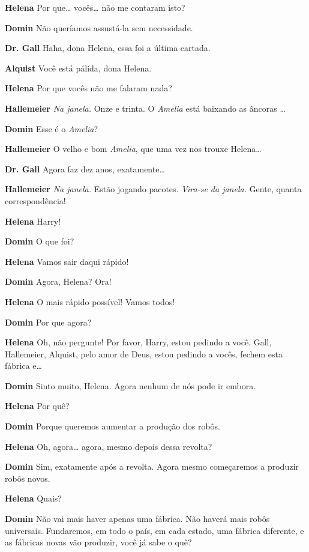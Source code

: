\textbf{Helena} Por que\ldots{} vocês\ldots{} não me contaram isto?

\textbf{Domin} Não queríamos assustá-la sem necessidade.

\textbf{Dr. Gall} Haha, dona Helena, essa foi a última cartada.

\textbf{Alquist} Você está pálida, dona Helena.

\textbf{Helena} Por que vocês não me falaram nada?

\textbf{Hallemeier} \emph{Na janela.} Onze e trinta. O \textit{Amelia} está baixando as âncoras
\ldots{}

\textbf{Domin} Esse é o \textit{Amelia}?

\textbf{Hallemeier} O velho e bom \textit{Amelia}, que uma vez nos trouxe Helena\ldots{}

\textbf{Dr. Gall} Agora faz dez anos, exatamente\ldots{}

\textbf{Hallemeier} \emph{Na janela.} Estão jogando pacotes. \emph{Vira-se da
janela.} Gente, quanta correspondência!

\textbf{Helena} Harry!

\textbf{Domin} O que foi?

\textbf{Helena} Vamos sair daqui rápido!

\textbf{Domin} Agora, Helena? Ora!

\textbf{Helena} O mais rápido possível! Vamos todos!

\textbf{Domin} Por que agora?

\textbf{Helena} Oh, não pergunte! Por favor, Harry, estou pedindo a você. Gall,
Hallemeier, Alquist, pelo amor de Deus, estou pedindo a vocês, fechem esta
fábrica e\ldots{}

\textbf{Domin} Sinto muito, Helena. Agora nenhum de nós pode ir embora.

\textbf{Helena} Por quê?

\textbf{Domin} Porque queremos aumentar a produção dos robôs.

\textbf{Helena} Oh, agora\ldots{} agora, mesmo depois dessa revolta?

\textbf{Domin} Sim, exatamente após a revolta. Agora mesmo começaremos a produzir robôs
novos.

\textbf{Helena} Quais?

\textbf{Domin} Não vai mais haver apenas uma fábrica. Não haverá mais robôs universais.
Fundaremos, em todo o país, em cada estado, uma fábrica diferente, e as fábricas
novas vão produzir, você já sabe o quê?

